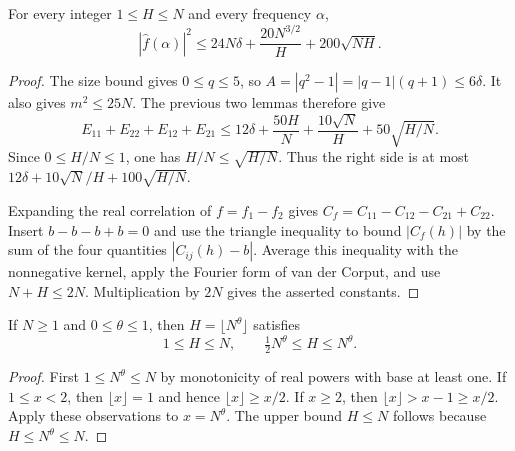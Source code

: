 \begin{lemma}
\label{core:master-bound}
For every integer $1\leq H\leq N$ and every frequency $\alpha$,
\[
 |\widehat f(\alpha)|^2
 \leq24N\delta+\frac{20N^{3/2}}{H}+200\sqrt{NH}.
\]
\end{lemma}
\begin{proof}
The size bound gives $0\leq q\leq5$, so
$A=|q^2-1|=|q-1|(q+1)\leq6\delta$.
It also gives $m^2\leq25N$.  The previous two lemmas therefore
give
\[
 E_{11}+E_{22}+E_{12}+E_{21}
 \leq12\delta+\frac{50H}{N}
       +\frac{10\sqrt N}{H}+50\sqrt{H/N}.
\]
Since $0\leq H/N\leq1$, one has $H/N\leq\sqrt{H/N}$.
Thus the right side is at most
$12\delta+10\sqrt N/H+100\sqrt{H/N}$.

Expanding the real correlation of $f=f_1-f_2$ gives
$C_f=C_{11}-C_{12}-C_{21}+C_{22}$.
Insert $b-b-b+b=0$ and use the triangle inequality to bound
$|C_f(h)|$ by the sum of the four quantities
$|C_{ij}(h)-b|$.  Average this inequality with the nonnegative
kernel, apply the Fourier form of van der Corput, and use
$N+H\leq2N$.  Multiplication by $2N$ gives the asserted constants.
\end{proof}

\begin{lemma}
\leanok
\label{core:rounded-window}
If $N\geq1$ and $0\leq\theta\leq1$, then
$H=\lfloor N^\theta\rfloor$ satisfies
\[
 1\leq H\leq N,\qquad \tfrac12N^\theta\leq H\leq N^\theta.
\]
\end{lemma}
\begin{proof}
First $1\leq N^\theta\leq N$ by monotonicity of real powers
with base at least one.  If $1\leq x<2$, then $\lfloor x\rfloor=1$
and hence $\lfloor x\rfloor\geq x/2$.  If $x\geq2$, then
$\lfloor x\rfloor>x-1\geq x/2$.
Apply these observations to $x=N^\theta$.  The upper bound
$H\leq N$ follows because $H\leq N^\theta\leq N$.
\end{proof}

